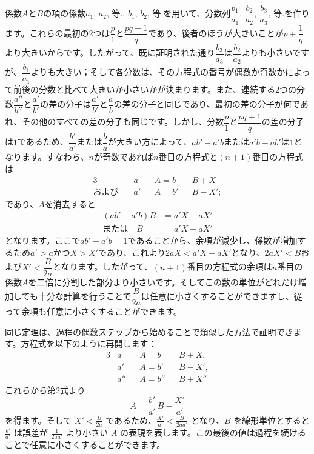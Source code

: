 \documentclass[a4paper,11pt,openany]{ltjsbook}
\newcommand{\Add}[1]{#1}
\begin{document}
係数$A$と$B$の項の係数$a_1$, $a_2$, 等., $b_1$, $b_2$, 等.を用いて、分数列$\dfrac{b_1}{a_1}$, $\dfrac{b_2}{a_2}$, $\dfrac{b_3}{a_3}$, 等.を作ります。これらの最初の2つは$\dfrac{p}{1}$と$\dfrac{pq + 1}{q}$であり、後者のほうが大きいことが$p + \dfrac{1}{q}$より大きいからです。したがって、既に証明された通り$\dfrac{b_3}{a_3}$は$\dfrac{b_2}{a_2}$よりも小さいですが、$\dfrac{b_1}{a_1}$よりも大きい；そして各分数は、その方程式の番号が偶数か奇数かによって前後の分数と比べて大きいか小さいかが決まります。また、連続する2つの分数$\dfrac{a''}{b''}$と$\dfrac{a'}{b'}$の差の分子は$\dfrac{a'}{b'}$と$\dfrac{a}{b}$の差の分子と同じであり、最初の差の分子が何であれ、その他のすべての差の分子も同じです。しかし、分数$\dfrac{p}{1}$と$\dfrac{pq + 1}{q}$の差の分子は$1$であるため、$\dfrac{b'}{a'}$または$\dfrac{b}{a}$が大きい方によって、$ab' - a'b$または$a'b - ab'$は$1$となります。すなわち、$n$が奇数であれば$n$番目の方程式と$(n + 1)$番目の方程式は
\begin{alignat*}{3}
&a &&A = b &&B + X \\
\text{および}\quad
&a'&&A = b'&& B - X';
\end{alignat*}
であり、$A$を消去すると
\begin{align*}
(ab' - a'b)B &= a'X + aX' \\
\text{または}\quad B &= a'X + aX'
\end{align*}
となります。ここで$ab' - a'b = 1$であることから、余項が減少し、係数が増加するため$a' > a$かつ$X > X'$であり、これより$2aX < a'X + aX'$となり、$2aX' < B$および$X' < \dfrac{B}{2a}$となります。したがって、$(n + 1)$番目の方程式の余項は$n$番目の係数$A$を二倍に分割した部分より小さいです。そしてこの数の単位がどれだけ増加しても十分な計算を行うことで$\dfrac{B}{2a}$は任意に小さくすることができますし、従って余項も任意に小さくすることができます。

同じ定理は、過程の偶数ステップから始めることで類似した方法で証明できます。方程式を以下のように再開します：
\begin{alignat*}{3}
&a  &&A = b   &&B + X\Add{,} \\
&a' &&A = b'  &&B - X'\Add{,} \\
&a''&&A = b'' &&B + X''
\end{alignat*}
これらから第2式より
\[
A = \frac{b'}{a'}\, B - \frac{X'}{a'}
\]
を得ます。そして $X' < \frac{B}{2a}$ であるため、$\frac{X'}{a'} < \frac{B}{2aa'}$ となり、$B$ を線形単位とすると $\frac{b'}{a'}$ は誤差が $\frac{1}{2aa'}$ より小さい $A$ の表現を表します。この最後の値は過程を続けることで任意に小さくすることができます。
\end{document}
